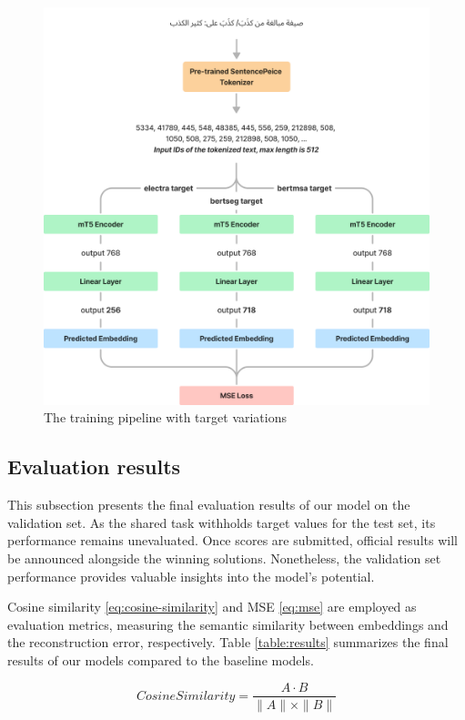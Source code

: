 \documentclass[15pt]{article}
\begin{document}
\begin{figure}
    \centering
    \captionsetup{justification=centering}
    \includegraphics[width=\textwidth]{training.png}
    \caption{The training pipeline with target variations}
    \label{fig:training}
\end{figure}

\subsection{Evaluation results}

This subsection presents the final evaluation results of our model on the validation set. As the shared task withholds target values for the test set, its performance remains unevaluated. Once scores are submitted, official results will be announced alongside the winning solutions. Nonetheless, the validation set performance provides valuable insights into the model's potential.

Cosine similarity \ref{eq:cosine-similarity} and MSE \ref{eq:mse} are employed as evaluation metrics, measuring the semantic similarity between embeddings and the reconstruction error, respectively. Table \ref{table:results} summarizes the final results of our models compared to the baseline models.

\begin{equation}\label{eq:cosine-similarity}
    Cosine Similarity = \frac{A \cdot B}{\|A\| \times \|B\|}
\end{equation}
\end{document}
